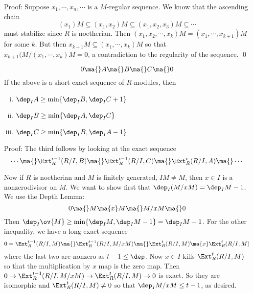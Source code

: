 \noindent Proof: Suppose $x_1,\cdots,x_n,\cdots$ is a $M$-regular sequence. We know that the ascending chain
\[
(x_1)M \subseteq (x_1,x_2)M \subseteq (x_1,x_2,x_3)M \subseteq \cdots
\]
must stabilize since $R$ is noetherian. Then $(x_1,x_2,\cdots,x_k)M=(x_1,\cdots,x_{k+1})M$ for some $k$. But then $x_{k+1}M\subseteq (x_1,\cdots,x_k)M$ so that $x_{k+1}(M/(x_1,\cdots,x_k)M=0$, a contradiction to the regularity of the sequence. \qed \\

\begin{lem}
\[
0 \ma{} A \ma{} B \ma{} C \ma{} 0
\]
If the above is a short exact sequence of $R$-modules, then
\begin{enumerate}[(i)]
\item $\dep_I A \geq \min\{ \dep_I B, \dep_I C+1\}$
\item $\dep_I B \geq \min\{\dep_I A, \dep_I C\}$
\item $\dep_I C \geq \min\{\dep_I B,\dep_I A-1\}$
\end{enumerate}
\end{lem}

\noindent Proof: The third follows by looking at the exact sequence
\[
\cdots \ma{} \Ext_R^{i-1}(R/I,B) \ma{} \Ext_R^{i-1}(R/I,C) \ma{} \Ext_R^i(R/I,A) \ma{} \cdots
\]

Now if $R$ is noetherian and $M$ is finitely generated, $IM \neq M$, then $x \in I$ is a nonzerodivisor on $M$. We want to show first that $\dep_I(M/xM)=\dep_I M-1$. We use the Depth Lemma:
\[
0 \ma{} M \ma{x} M \ma{} M/xM \ma{} 0
\]
Then $\dep_I \ov{M} \geq \min\{\dep_I M,\dep_I M-1\}= \dep_I M-1$. For the other inequality, we have a long exact sequence 
\[
0=\Ext_R^{t-1}(R/I,M) \ma{} \Ext_R^{t-1}(R/I,M/xM) \ma{} \Ext_R^t(R/I,M) \ma{x} \Ext_R^t(R/I,M)
\]
where the last two are nonzero as $t-1 \leq \dep$. Now $x \in I$ kills $\Ext_R^t(R/I,M)$ so that the multiplication by $x$ map is the zero map. Then $0 \to \Ext_R^{t-1}(R/I,M/xM) \to \Ext_R^t(R/I,M) \to 0$ is exact. So they are isomorphic and $\Ext_R^t(R/I,M) \neq 0$ so that $\dep_I M/xM \leq t-1$, as desired. 

